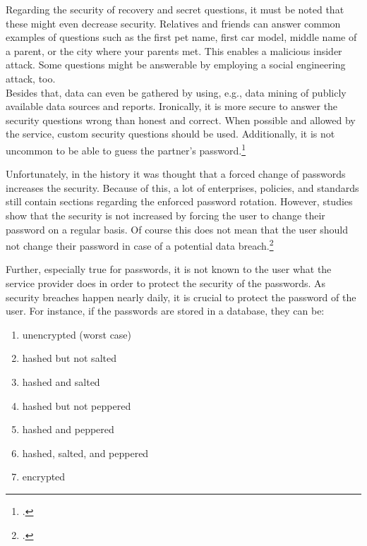 Regarding the security of recovery and secret questions, it must be noted that these might even decrease security. Relatives and friends can answer common examples of questions such as \frqq the first pet name, first car model, middle name of a parent, or the city where your parents met\flqq{}. This enables a malicious insider attack. Some questions might be answerable by employing a social engineering attack, too.\\
Besides that, data can even be gathered by using, e.g., data mining of publicly available data sources and reports. Ironically, it is more secure to answer the security questions wrong than honest and correct. When possible and allowed by the service, custom security questions should be used. Additionally, it is not uncommon to be able to guess the partner's password.\footcites[See][11]{lastpass}[See][169]{Brainard2006}[See][]{Bonneau:2015:SLA:2736277.2741691}[See][5--6]{Rabkin:2008:PKQ:1408664.1408667}[See][386]{5207657}

Unfortunately, in the history it was thought that a forced change of passwords increases the security. Because of this, a lot of enterprises, policies, and standards still contain sections regarding the enforced password rotation. However, studies show that the security is not increased by forcing the user to change their password on a regular basis. Of course this does not mean that the user should not change their password in case of a potential data breach.\footcites[See][1520]{deutschlandgrundschutz}[See][14]{SP80063B}[See][]{7676198}[See][34]{anderson2008security}

Further, especially true for passwords, it is not known to the user what the service provider does in order to protect the security of the passwords. As security breaches happen nearly daily, it is crucial to protect the password of the user. For instance, if the passwords are stored in a database, they can be:

\begin{enumerate}[label=(\alph*)]
	\item unencrypted (worst case)
	\item hashed but not salted
	\item hashed and salted
	\item hashed but not peppered
	\item hashed and peppered
	\item hashed, salted, and peppered
	\item encrypted
\end{enumerate}

